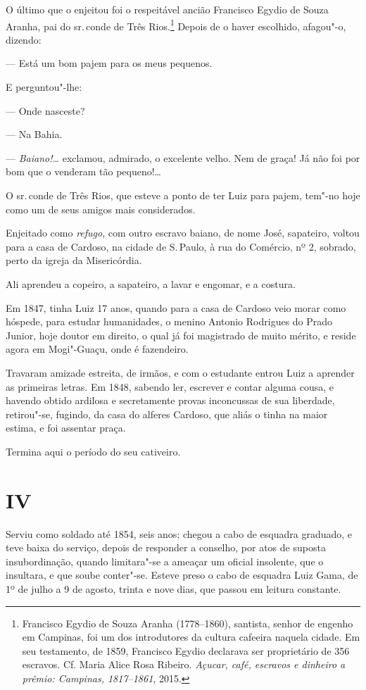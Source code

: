 O último que o enjeitou foi o respeitável ancião Francisco Egydio de
Souza Aranha, pai do sr.\,conde de Três Rios.\footnote{Francisco Egydio
  de Souza Aranha (1778--1860), santista, senhor de engenho em Campinas,
  foi um dos introdutores da cultura cafeeira naquela cidade. Em seu
  testamento, de 1859, Francisco Egydio declarava ser proprietário de
  356 escravos. Cf. Maria Alice Rosa Ribeiro. \emph{Açucar, café,
  escravos e dinheiro a prêmio: Campinas, 1817--1861}, 2015.} Depois de o
haver escolhido, afagou"-o, dizendo:

--- Está um bom pajem para os meus pequenos.

E perguntou"-lhe:

--- Onde nasceste?

--- Na Bahia.

--- \emph{Baiano!\ldots{}} exclamou, admirado, o excelente velho. Nem de
graça! Já não foi por bom que o venderam tão pequeno!\ldots{}

O sr.\,conde de Três Rios, que esteve a ponto de ter Luiz para pajem,
tem"-no hoje como um de seus amigos mais considerados.

Enjeitado como \emph{refugo}, com outro escravo baiano, de nome José,
sapateiro, voltou para a casa de Cardoso, na cidade de S.\,Paulo, à rua
do Comércio, nº 2, sobrado, perto da igreja da Misericórdia.

Ali aprendeu a copeiro, a sapateiro, a lavar e engomar, e a costura.

Em 1847, tinha Luiz 17 anos, quando para a casa de Cardoso veio morar
como hóspede, para estudar humanidades, o menino Antonio Rodrigues do
Prado Junior, hoje doutor em direito, o qual já foi magistrado de muito
mérito, e reside agora em Mogi"-Guaçu, onde é fazendeiro.

Travaram amizade estreita, de irmãos, e com o estudante entrou Luiz a
aprender as primeiras letras. Em 1848, sabendo ler, escrever e contar
alguma cousa, e havendo obtido ardilosa e secretamente provas
inconcussas de sua liberdade, retirou"-se, fugindo, da casa do alferes
Cardoso, que aliás o tinha na maior estima, e foi assentar praça.

Termina aqui o período do seu cativeiro.

\section*{IV}

Serviu como soldado até 1854, seis anos; chegou a cabo de esquadra
graduado, e teve baixa do serviço, depois de responder a conselho, por
atos de suposta insubordinação, quando limitara"-se a ameaçar um oficial
insolente, que o insultara, e que soube conter"-se. Esteve preso o cabo
de esquadra Luiz Gama, de 1º de julho a 9 de agosto, trinta e nove dias,
que passou em leitura constante.

